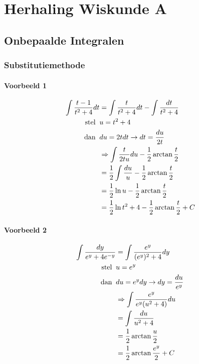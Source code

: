 \part{Herhaling Wiskunde A}
\chapter{Onbepaalde Integralen}
\section{Substitutiemethode}
\subsection{Voorbeeld 1}
\begin{equation*}
    \begin{split}
        \int \frac{t - 1}{t^2 + 4}dt & = \int \frac{t}{t^2 + 4}dt - \int \frac{dt}{t^2 + 4} \\
        \hbox{stel}\;\; &  u = t^2 + 4        \\
        \hbox{dan}\;\; & du = 2tdt \rightarrow dt = \frac{du}{2t} \\
        & \Rightarrow \int \frac{t}{2t u} du - \frac{1}{2}\arctan{\frac{t}{2}} \\
        & = \frac{1}{2}\int \frac{du}{u} - \frac{1}{2}\arctan{\frac{t}{2}}\\
        & = \frac{1}{2}\ln{u} - \frac{1}{2}\arctan{\frac{t}{2}} \\
        & = \frac{1}{2}\ln{t^2 + 4} - \frac{1}{2}\arctan{\frac{t}{2}} + C
    \end{split}
\end{equation*}
\subsection{Voorbeeld 2}
\begin{equation*}
    \begin{split}
        \int \frac{dy}{e^y + 4e^{-y}} & = \int \frac{e^y}{(e^y)^2 + 4} dy \\
        \hbox{stel}\;\; & u = e^y \\
        \hbox{dan}\;\; & du = e^ydy \rightarrow dy = \frac{du}{e^y}\\
        & \Rightarrow \int \frac{e^y}{e^y(u^2 + 4)} du \\
        & = \int \frac{du}{u^2 + 4} \\
        & = \frac{1}{2}\arctan{\frac{u}{2}}\\
        & = \frac{1}{2}\arctan{\frac{e^y}{2}} + C\\
    \end{split}
\end{equation*}
